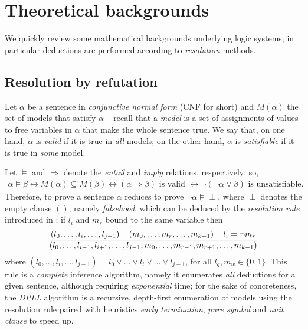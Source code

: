 \documentclass[a4paper,12pt]{article}
\begin{document}
\section{Theoretical backgrounds}

We quickly review some mathematical backgrounds underlying logic systems;
in particular deductions are performed according to \emph{resolution} methods.

\subsection{Resolution by refutation} 

Let $\alpha$ be a sentence in \emph{conjunctive normal
form} (CNF for short) and $M(\alpha)$ the set of models that satisfy $\alpha$
-- recall that a \emph{model} is a set of assignments of values to free
variables in $\alpha$ that make the whole sentence true.  We say that, on one
hand, $\alpha$ is \textit{valid} if it is true in \textit{all} models; on the
other hand, $\alpha$ is \textit{satisfiable} if it is true in \textit{some}
model.

Let $\models$ and $\Rightarrow$ denote the \textit{entail} and \textit{imply}
relations, respectively; so,
\begin{displaymath}
\begin{split}
\alpha \models \beta \leftrightarrow
M(\alpha) \subseteq M(\beta) \leftrightarrow
(\alpha \Rightarrow \beta) \text{ is valid } \leftrightarrow
\neg(\neg\alpha \vee \beta) \text{ is unsatisfiable.}
\end{split}
\end{displaymath}
Therefore, to prove a sentence $\alpha$ reduces to prove
$\neg\alpha\models\perp$, where $\perp$ denotes the empty clause $()$, namely
\textit{falsehood}, which can be deduced by the \textit{resolution rule}
introduced in \citep{Robinson:1965:MLB:321250.321253}; if $l_{i}$ and $m_{r}$
bound to the same variable then
\begin{displaymath}
{\left(l_{0}, \ldots, l_{i}, \ldots, l_{j-1}\right) \quad \left(m_{0}, \ldots, m_{r},\ldots, m_{k-1}\right) \quad l_{i} = \neg m_{r}
\over
\left(l_{0},\ldots, l_{i-1},l_{i+1}, \ldots,l_{j-1}, m_{0},\ldots, m_{r-1},m_{r+1},\ldots, m_{k-1}\right)}
\end{displaymath}
where $\left(l_{0},\ldots, l_{i}, \ldots, l_{j-1}\right) = l_{0}\vee \ldots
\vee l_{i} \vee \ldots \vee l_{j-1}$, for all $l_{q}, m_{w} \in\lbrace 0,1\rbrace$.
This rule is a \textit{complete} inference algorithm, namely it enumerates
\emph{all} deductions for a given sentence, although requiring
\emph{exponential} time; for the sake of concreteness, the \textit{DPLL}
algorithm \citep{Davis:1962:MPT:368273.368557}
is a recursive, depth-first enumeration of models using the
resolution rule paired with heuristics \textit{early termination},
\textit{pure symbol} and \textit{unit clause} to speed up.
\end{document}
